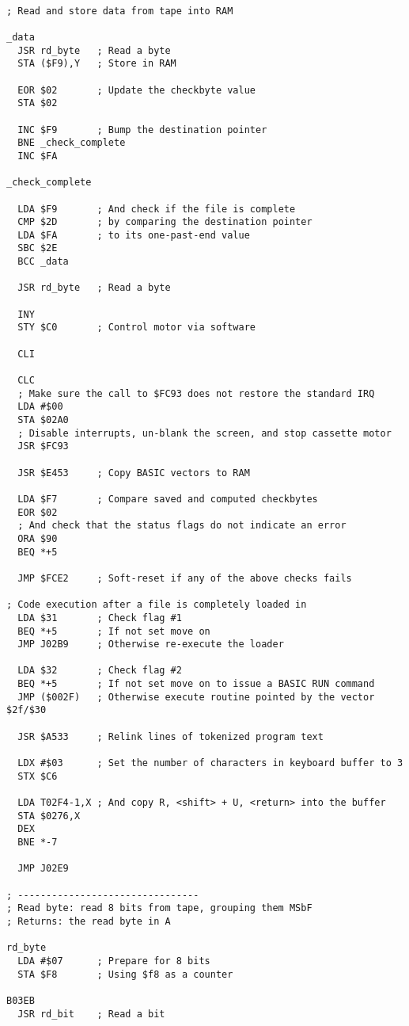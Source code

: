 \hspace{0.5cm}
\begin{minipage}[b]{0.50\linewidth}
\centering
\begin{lstlisting}[basicstyle=\tiny\ttfamily]

; Read and store data from tape into RAM

_data
  JSR rd_byte   ; Read a byte
  STA ($F9),Y   ; Store in RAM

  EOR $02       ; Update the checkbyte value
  STA $02       

  INC $F9       ; Bump the destination pointer
  BNE _check_complete       
  INC $FA       

_check_complete
  
  LDA $F9       ; And check if the file is complete
  CMP $2D       ; by comparing the destination pointer
  LDA $FA       ; to its one-past-end value
  SBC $2E       
  BCC _data     

  JSR rd_byte   ; Read a byte

  INY           
  STY $C0       ; Control motor via software

  CLI           

  CLC           
  ; Make sure the call to $FC93 does not restore the standard IRQ
  LDA #$00      
  STA $02A0     
  ; Disable interrupts, un-blank the screen, and stop cassette motor
  JSR $FC93     

  JSR $E453     ; Copy BASIC vectors to RAM

  LDA $F7       ; Compare saved and computed checkbytes
  EOR $02       
  ; And check that the status flags do not indicate an error
  ORA $90       
  BEQ *+5       

  JMP $FCE2     ; Soft-reset if any of the above checks fails

; Code execution after a file is completely loaded in
  LDA $31       ; Check flag #1
  BEQ *+5       ; If not set move on
  JMP J02B9     ; Otherwise re-execute the loader

  LDA $32       ; Check flag #2
  BEQ *+5       ; If not set move on to issue a BASIC RUN command
  JMP ($002F)   ; Otherwise execute routine pointed by the vector $2f/$30

  JSR $A533     ; Relink lines of tokenized program text

  LDX #$03      ; Set the number of characters in keyboard buffer to 3
  STX $C6       

  LDA T02F4-1,X ; And copy R, <shift> + U, <return> into the buffer
  STA $0276,X   
  DEX           
  BNE *-7       

  JMP J02E9     

; --------------------------------
; Read byte: read 8 bits from tape, grouping them MSbF
; Returns: the read byte in A

rd_byte
  LDA #$07      ; Prepare for 8 bits
  STA $F8       ; Using $f8 as a counter

B03EB
  JSR rd_bit    ; Read a bit
\end{lstlisting}
\end{minipage}

